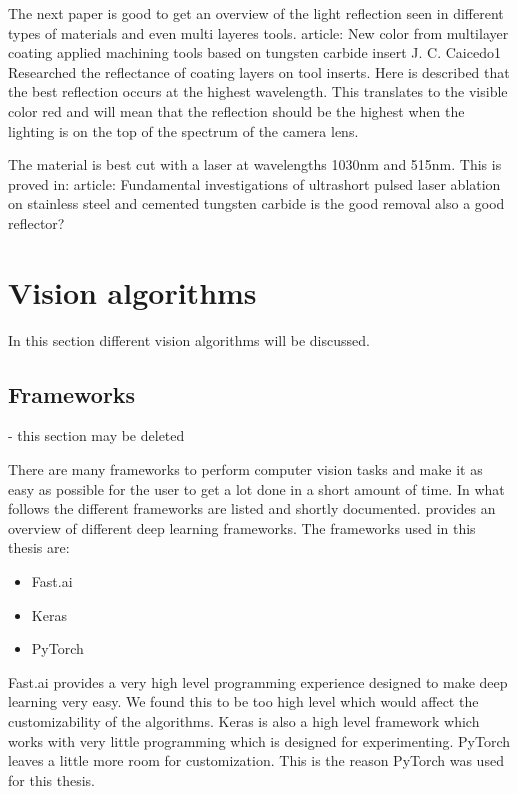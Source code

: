 			
 The next paper is good to get an overview of the light reflection seen in different types of materials and even multi layeres tools.
	article: New color from multilayer coating applied machining tools based on tungsten carbide insert
	J. C. Caicedo1
	\cite{Caicedo2019} Researched the reflectance of coating layers on tool inserts. Here is described that the best reflection occurs at the highest wavelength. This translates to the visible color red and will mean that the reflection should be the highest when the lighting is on the top of the spectrum of the camera lens. 

The material is best cut with a laser at wavelengths 1030nm and 515nm. This is proved in: 
	article: Fundamental investigations of ultrashort pulsed laser ablation on stainless steel and cemented tungsten carbide
	is the good removal also a good reflector?
		
\section{Vision algorithms}
	In this section different vision algorithms will be discussed. 
	
	\subsection{Frameworks}
	- this section may be deleted
	
		There are many frameworks to perform computer vision tasks and make it as easy as possible for the user to get a lot done in a short amount of time. In what follows the different frameworks are listed and shortly documented. \cite{basnet2019towards} provides an overview of different deep learning frameworks. The frameworks used in this thesis are:
		\begin{itemize}
		\item Fast.ai  \citep{fastai} 
		\item Keras \citep{keras} 
		\item PyTorch \citep{pytorch} 
		\end{itemize}
		
		Fast.ai provides a very high level programming experience designed to make deep learning very easy. We found this to be too high level which would affect the customizability of the algorithms.
		Keras is also a high level framework which works with very little programming which is designed for experimenting. 
		PyTorch leaves a little more room for customization. This is the reason PyTorch was used for this thesis. 
		
